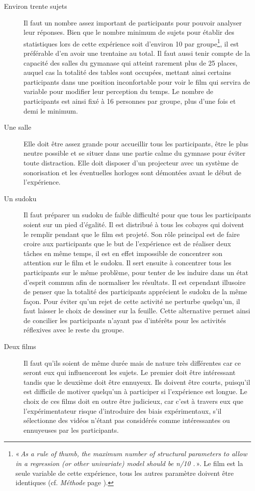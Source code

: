 \documentclass[12pt,fleqn,oneside,openany]{book} %
\begin{document}
\begin{description}
	\item[Environ trente sujets] Il faut un nombre assez important de participants pour pouvoir analyser leur réponses. Bien que le nombre minimum de sujets pour établir des statistiques lors de cette expérience soit d'environ 10 par groupe\footnote{«\,\emph{As a rule of thumb, the maximum number of structural parameters to allow in a regression (or other univariate) model should be \emph{n}/10 \emph{\cite{burnhamAnderson}}.}\,». Le film est la seule variable de cette expérience, tous les autres paramètre doivent être identiques (cf. \emph{Méthode} page \pageref{sssec:methode1}).}, il est préférable d'en avoir une trentaine au total. Il faut aussi tenir compte de la capacité des salles du gymanase qui atteint rarement plus de 25 places, auquel cas la totalité des tables sont occupées, mettant ainsi certains participants dans une position inconfortable pour voir le film qui servira de variable pour modifier leur perception du temps. Le nombre de participants est ainsi fixé à 16 personnes par groupe, plus d'une fois et demi le minimum.
	\item[Une salle] Elle doit être assez grande pour accueillir tous les participants, être le plus neutre possible et se situer dans une partie calme du gymnase pour éviter toute distraction. Elle doit disposer d'un projecteur avec un système de sonorisation et les éventuelles horloges sont démontées avant le début de l'expérience.
	\item[Un sudoku] Il faut préparer un sudoku de faible difficulté pour que tous les participants soient sur un pied d'égalité. Il est distribué à tous les cobayes qui doivent le remplir pendant que le film est projeté. Son rôle principal est de faire croire aux participants que le but de l'expérience est de réaliser deux tâches en même temps, il est en effet impossible de concentrer son attention sur le film et le sudoku. Il sert ensuite à concentrer tous les participants sur le même problème, pour tenter de les induire dans un état d'esprit commun afin de normaliser les résultats. Il est cependant illusoire de penser que la totalité des participants apprécient le sudoku de la même façon. Pour éviter qu'un rejet de cette activité ne perturbe quelqu'un, il faut laisser le choix de dessiner sur la feuille. Cette alternative permet ainsi de concilier les participants n'ayant pas d'intérêts pour les activités réflexives avec le reste du groupe.
	\item[Deux films] Il faut qu'ils soient de même durée mais de nature très différentes car ce seront eux qui influenceront les sujets. Le premier doit être intéressant tandis que le deuxième doit être ennuyeux. Ils doivent être courts, puisqu'il est difficile de motiver quelqu'un à participer si l'expérience est longue. Le choix de ces films doit en outre être judicieux, car c'est à travers eux que l'expérimentateur risque d'introduire des biais expérimentaux, s'il sélectionne des vidéos n'étant pas considérés comme intéressantes ou ennuyeuses par les participants. 


\end{description}
\end{document}
